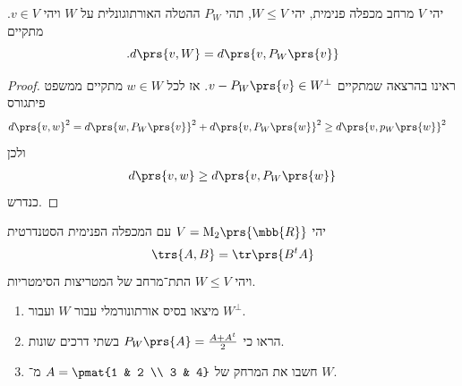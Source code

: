 \documentclass[a4paper,10pt,twoside,openany]{book}
\renewcommand{\Mat}{\mathrm{M}}
\begin{document}
\begin{theorem}
יהי
$V$
מרחב מכפלה פנימית, יהי
$W \leq V$,
תהי
$P_W$
ההטלה האורתוגונלית על
$W$
ויהי
$v \in V$.
מתקיים
\[\text{.} d\prs{v,W} = d\prs{v, P_W\prs{v}}\]
\end{theorem}

\begin{proof}
ראינו בהרצאה שמתקיים
$v - P_W\prs{v} \in W^\perp$.
אז לכל
$w \in W$
מתקיים ממשפט פיתגורס
\begin{align*}
d\prs{v,w}^2 &= d\prs{w, P_W\prs{v}}^2 + d\prs{v, P_W\prs{w}}^2 \geq d\prs{v,p_W\prs{w}}^2
\end{align*}
ולכן
\begin{align*}
d\prs{v,w} \geq d\prs{v, P_W\prs{w}}
\end{align*}
כנדרש.
\end{proof}

\begin{exercisechap}
יהי
$V = \Mat_2\prs{\mbb{R}}$
עם המכפלה הפנימית הסטנדרטית
\[\trs{A,B} = \tr\prs{B^t A}\]
ויהי
$W \leq V$
התת־מרחב של המטריצות הסימטריות.

\begin{enumerate}
\item מיצאו בסיס אורתונורמלי עבור
$W$
ועבור
$W^\perp$.

\item
הראו כי
$P_W\prs{A} = \frac{A + A^t}{2}$
בשתי דרכים שונות.

\item
חשבו את המרחק של
$A = \pmat{1 & 2 \\ 3 & 4}$
מ־%
$W$.
\end{enumerate}
\end{exercisechap}
\end{document}
